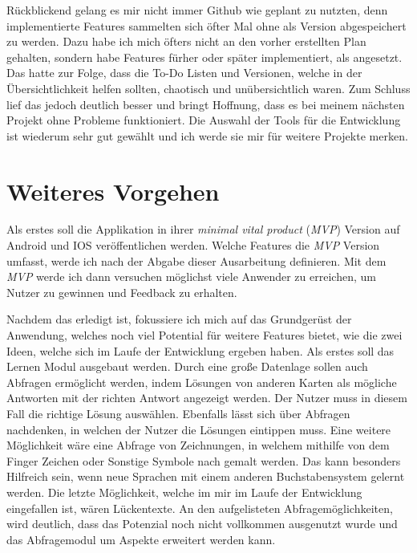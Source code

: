 Rückblickend gelang es mir nicht immer Github wie geplant zu nutzten, denn implementierte Features sammelten sich öfter Mal ohne als Version abgespeichert zu werden. Dazu habe ich mich öfters nicht an den vorher erstellten Plan gehalten, sondern habe Features fürher oder später implementiert, als angesetzt. Das hatte zur Folge, dass die To-Do Listen und Versionen, welche in der Übersichtlichkeit helfen sollten, chaotisch und unübersichtlich waren. Zum Schluss lief das jedoch deutlich besser und bringt Hoffnung, dass es bei meinem nächsten Projekt ohne Probleme funktioniert. Die Auswahl der Tools für die Entwicklung ist wiederum sehr gut gewählt und ich werde sie mir für weitere Projekte merken.

\section{Weiteres Vorgehen} \label{weiteresvorgehen}
Als erstes soll die Applikation in ihrer \textit{minimal vital product} (\textit{MVP}) Version auf Android und IOS veröffentlichen werden. Welche Features die \textit{MVP} Version umfasst, werde ich nach der Abgabe dieser Ausarbeitung definieren. Mit dem \textit{MVP} werde ich dann versuchen möglichst viele Anwender zu erreichen, um Nutzer zu gewinnen und Feedback zu erhalten.

Nachdem das erledigt ist, fokussiere ich mich auf das Grundgerüst der Anwendung, welches noch viel Potential für weitere Features bietet, wie die zwei Ideen, welche sich im Laufe der Entwicklung ergeben haben. Als erstes soll das Lernen Modul ausgebaut werden. Durch eine große Datenlage sollen auch Abfragen ermöglicht werden, indem Lösungen von anderen Karten als mögliche Antworten mit der richten Antwort angezeigt werden. Der Nutzer muss in diesem Fall die richtige Lösung auswählen. Ebenfalls lässt sich über Abfragen nachdenken, in welchen der Nutzer die Lösungen eintippen muss. Eine weitere Möglichkeit wäre eine Abfrage von Zeichnungen, in welchem mithilfe von dem Finger Zeichen oder Sonstige Symbole nach gemalt werden. Das kann besonders Hilfreich sein, wenn neue Sprachen mit einem anderen Buchstabensystem gelernt werden. Die letzte Möglichkeit, welche im mir im Laufe der Entwicklung eingefallen ist, wären Lückentexte. An den aufgelisteten Abfragemöglichkeiten, wird deutlich, dass das Potenzial noch nicht vollkommen ausgenutzt wurde und das Abfragemodul um Aspekte erweitert werden kann.

